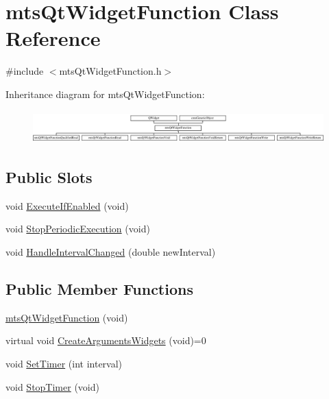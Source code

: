 \hypertarget{classmts_qt_widget_function}{}\section{mts\+Qt\+Widget\+Function Class Reference}
\label{classmts_qt_widget_function}


{\ttfamily \#include $<$mts\+Qt\+Widget\+Function.\+h$>$}

Inheritance diagram for mts\+Qt\+Widget\+Function\+:\begin{figure}[H]
\begin{center}
\leavevmode
\includegraphics[height=1.284404cm]{d2/d28/classmts_qt_widget_function}
\end{center}
\end{figure}
\subsection*{Public Slots}
\begin{DoxyCompactItemize}
\item 
void \hyperlink{classmts_qt_widget_function_a04e8f574fb0391db00e305c43bc5130f}{Execute\+If\+Enabled} (void)
\item 
void \hyperlink{classmts_qt_widget_function_adba92a5b6f3273d57f7aa1e1960590de}{Stop\+Periodic\+Execution} (void)
\item 
void \hyperlink{classmts_qt_widget_function_a3eea83e5737eb86da0465ce212c877bc}{Handle\+Interval\+Changed} (double new\+Interval)
\end{DoxyCompactItemize}
\subsection*{Public Member Functions}
\begin{DoxyCompactItemize}
\item 
\hyperlink{classmts_qt_widget_function_a4da32c52c82426c6f0dc17d1ec93acfb}{mts\+Qt\+Widget\+Function} (void)
\item 
virtual void \hyperlink{classmts_qt_widget_function_ac094c3a595e05c3ee2a8e030ec6e6d2f}{Create\+Arguments\+Widgets} (void)=0
\item 
void \hyperlink{classmts_qt_widget_function_a07416703ef93e097e5a535fc269d214f}{Set\+Timer} (int interval)
\item 
void \hyperlink{classmts_qt_widget_function_ad5d85054e31d9b925781f469f619c764}{Stop\+Timer} (void)
\end{DoxyCompactItemize}
